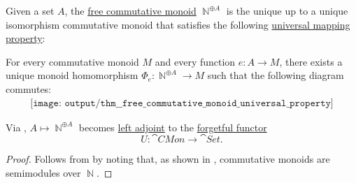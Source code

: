 \begin{theorem}\label{thm:free_commutative_monoid_universal_property}
  Given a set \( A \), the \hyperref[def:free_commutative_monoid]{free commutative monoid} \( \BbbN^{\oplus A} \) is the unique up to a unique isomorphism commutative monoid that satisfies the following \hyperref[rem:universal_mapping_property]{universal mapping property}:
  \begin{displayquote}
    For every commutative monoid \( M \) and every function \( e: A \to M \), there exists a unique monoid homomorphism \( \Phi_e: \BbbN^{\oplus A} \to M \) such that the following diagram commutes:
    \begin{equation}\label{eq:thm:free_commutative_monoid_universal_property/diagram}
      \begin{aligned}
        \texttt{[image: output/thm\_\_free\_commutative\_monoid\_universal\_property]}
      \end{aligned}
    \end{equation}
  \end{displayquote}
\end{theorem}
\begin{comments}
  \item Via , \( A \mapsto \BbbN^{\oplus A} \) becomes \hyperref[def:category_adjunction]{left adjoint} to the \hyperref[def:concrete_category]{forgetful functor}
  \begin{equation*}
    U: \cat{CMon} \to \cat{Set}.
  \end{equation*}
\end{comments}
\begin{proof}
  Follows from  by noting that, as shown in , commutative monoids are semimodules over \( \BbbN \).
\end{proof}
